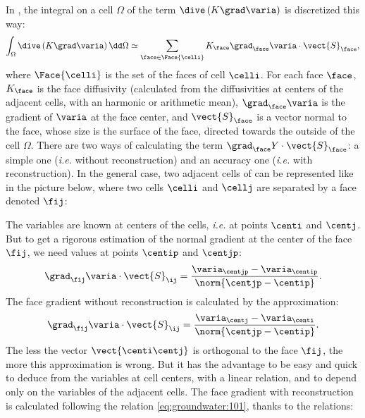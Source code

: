 In \CS, the integral on a cell $\Omega$ of the term $\dive \left( K \grad \varia \right)$ is discretized this way:
\begin{equation}
 \label{eq:groundwater:discrete_diffusive}
\int_{\Omega} \dive \left( K \grad \varia \right) \dd \Omega \simeq \sum_{\face \in \Face{\celli}} K_\face \grad_\face \varia \cdot \vect{S}_\face,
\end{equation}
where $\Face{\celli}$ is the set of the faces of cell $\celli$. For each face $\face$,
$K_\face$ is the face diffusivity (calculated from the diffusivities at centers of
the adjacent cells, with an harmonic or arithmetic mean),
$\grad_\face \varia$ is the gradient of $\varia$ at the face center,
and $\vect{S}_\face$ is a vector normal to the face, whose size is the surface of the face, directed towards the outside of the cell $\Omega$.
There are two ways of calculating the term $\grad_\face Y \cdot \vect{S}_\face$: a simple one (\emph{i.e.} without reconstruction)
and an accuracy one (\emph{i.e.} with reconstruction). In the general case, two adjacent cells of \CS can be represented like in the picture below,
where two cells $\celli$ and $\cellj$ are separated by a face denoted $\fij$:
\begin{figure}[!h]
\end{figure}
The variables are known at centers of the cells, \emph{i.e.} at points $\centi$ and $\centj$. But to get a rigorous estimation of the normal gradient at
the center of the face $\fij$, we need values at points $\centip$ and $\centjp$:
\begin{equation}
 \label{eq:groundwater:101}
  \grad_{\fij}\varia \cdot \vect{S}_{\ij} = \frac{\varia_{\centjp}-\varia_{\centip}}{\norm{\centjp - \centip}}.
\end{equation}
The face gradient without reconstruction is calculated by the approximation:
\begin{equation}
 \label{eq:groundwater:102}
  \grad_{\fij}\varia \cdot \vect{S}_{\ij} = \frac{\varia_{\centj}-\varia_{\centi}}{\norm{\centjp - \centip}}.
\end{equation}
The less the vector $\vect{\centi\centj}$ is orthogonal to the face $\fij$, the more this approximation is wrong. But it has the advantage to be easy and quick
to deduce from the variables at cell centers, with a linear relation, and to depend only on the variables of the adjacent cells.
The face gradient with reconstruction is calculated following the relation \eqref{eq:groundwater:101}, thanks to the relations:
